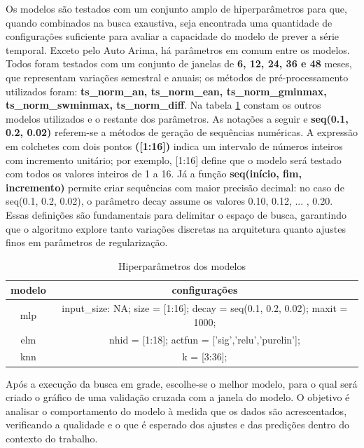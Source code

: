 \documentclass[12pt]{tcc}
\begin{document}
Os modelos são testados com um conjunto amplo de hiperparâmetros para que, quando combinados na busca exaustiva, seja encontrada uma quantidade de configurações suficiente para avaliar a capacidade do modelo de prever a série temporal. 
Exceto pelo Auto Arima, há parâmetros em comum entre os modelos. Todos foram testados com um conjunto de janelas de \textbf{6, 12, 24, 36 e 48} meses, que representam variações semestral e anuais; os métodos de pré-processamento utilizados foram: \textbf{ts\_norm\_an, ts\_norm\_ean, ts\_norm\_gminmax, ts\_norm\_swminmax, ts\_norm\_diff}. Na tabela \ref{tab:tabela_modelos} constam os outros modelos utilizados e o restante dos parâmetros. As notações a seguir e \textbf{seq(0.1, 0.2, 0.02)} referem-se a métodos de geração de sequências numéricas. A expressão em colchetes com dois pontos \textbf{([1:16])} indica um intervalo de números inteiros com incremento unitário; por exemplo, [1:16] define que o modelo será testado com todos os valores inteiros de 1 a 16. Já a função \textbf{seq(início, fim, incremento)} permite criar sequências com maior precisão decimal: no caso de seq(0.1, 0.2, 0.02), o parâmetro decay assume os valores 0.10, 0.12, ... , 0.20. Essas definições são fundamentais para delimitar o espaço de busca, garantindo que o algoritmo explore tanto variações discretas na arquitetura quanto ajustes finos em parâmetros de regularização.

\begin{table}[!ht]
    \centering
    \caption{Hiperparâmetros dos modelos}
    \begin{tabular}{c c} 
        \hline
        \textbf{modelo} & \textbf{configurações} \\
        \hline
        mlp & input\_size: NA;  size = [1:16];  decay = seq(0.1, 0.2, 0.02);  maxit = 1000;  
        \\
        elm & nhid = [1:18]; actfun = ['sig','relu','purelin'];
        \\
        knn & k = [3:36];
        \\
        \hline
    \end{tabular}
    \label{tab:tabela_modelos}
\end{table}

Após a execução da busca em grade, escolhe-se o melhor modelo, para o qual será criado o gráfico de uma validação cruzada com a janela do modelo. O objetivo é analisar o comportamento do modelo à medida que os dados são acrescentados, verificando a qualidade e o que é esperado dos ajustes e das predições dentro do contexto do trabalho. 
\end{document}
